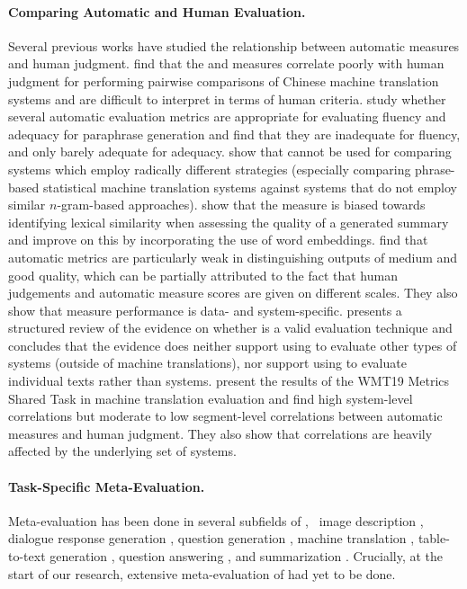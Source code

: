 \paragraph{Comparing Automatic and Human Evaluation.} Several previous works have studied the relationship between automatic measures and human judgment. \citet{zhang2004interpreting} find that the {\bleu} and {\nist} measures correlate poorly with human judgment for performing pairwise comparisons of Chinese machine translation systems and are difficult to interpret in terms of human criteria. \citet{stent2005evaluating} study whether several automatic evaluation metrics are appropriate for evaluating fluency and adequacy for paraphrase generation and find that they are inadequate for fluency, and only barely adequate for adequacy. \citet{callison-burch-etal-2006-evaluating} show that {\bleu} cannot be used for comparing systems which employ radically different strategies (especially comparing phrase-based statistical machine translation systems against systems that do not employ similar $n$-gram-based approaches). \citet{ng2015better} show that the {\rouge} measure is biased towards identifying lexical similarity when assessing the quality of a generated summary and improve on this by incorporating the use of word embeddings. \citet{novikova2017we} find that automatic metrics are particularly weak in distinguishing outputs of medium and good quality, which can be partially attributed to the fact that human judgements and automatic measure scores are given on different scales. They also show that measure performance is data- and system-specific. \citet{reiter2018structured} presents a structured review
of the evidence on whether {\bleu} is a valid evaluation technique and concludes that the evidence does neither support using {\bleu} to evaluate other types of {\nlp} systems (outside of machine translations), nor support using {\bleu} to evaluate individual texts rather than {\nlp} systems. \citet{ma-etal-2019-results} present the results of the \textsc{WMT19} Metrics Shared Task in machine translation evaluation and find high system-level correlations but moderate to low segment-level correlations between automatic measures and human judgment. They also show that correlations are heavily affected by the underlying set of systems.

\paragraph{Task-Specific Meta-Evaluation.} Meta-evaluation has been done in several subfields of {\nlp}, {\eg}\ image description \citep{elliott-keller-2014-comparing}, dialogue response generation \citep{liu-etal-2016-evaluate}, question generation \citep{nema-khapra-2018-towards}, machine translation \citep{mathur-etal-2020-tangled, ma-etal-2019-results}, table-to-text generation \citep{dhingra-etal-2019-handling}, question answering \citep{chen-etal-2019-evaluating}, and summarization \citep{bhandari2020re}. Crucially, at the start of our research, extensive meta-evaluation of {\asgfull} had yet to be done.

